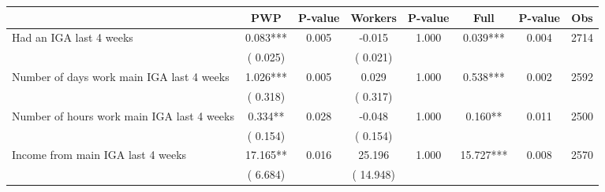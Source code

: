 
\begin{tabular}{l*{7}{c}}\hline&\multicolumn{1}{c}{PWP}&\multicolumn{1}{c}{P-value}&\multicolumn{1}{c}{Workers}&\multicolumn{1}{c}{P-value}&\multicolumn{1}{c}{Full}&\multicolumn{1}{c}{P-value}&\multicolumn{1}{c}{Obs} \\ \hline

 Had an IGA last 4 weeks       &              0.083***       &        0.005  &             -0.015       &        1.000  &              0.039***       &              0.004 &  2714 \\ 
                       &       (       0.025)             &                               &       (       0.021)                     &                               &                                               &                                &                      \\ 

 Number of days work main IGA last 4 weeks       &              1.026***       &        0.005  &              0.029       &        1.000  &              0.538***       &              0.002 &  2592 \\ 
                       &       (       0.318)             &                               &       (       0.317)                     &                               &                                               &                                &                      \\ 

 Number of hours work main IGA last 4 weeks       &              0.334**       &        0.028  &             -0.048       &        1.000  &              0.160**       &              0.011 &  2500 \\ 
                       &       (       0.154)             &                               &       (       0.154)                     &                               &                                               &                                &                      \\ 

 Income from main IGA last 4 weeks       &             17.165**       &        0.016  &             25.196       &        1.000  &             15.727***       &              0.008 &  2570 \\ 
                       &       (       6.684)             &                               &       (      14.948)                     &                               &                                               &                                &                      \\ 


\end{tabular}

